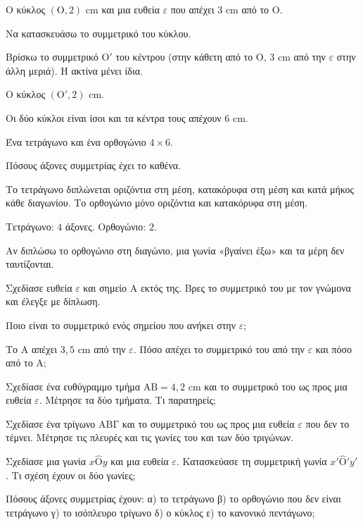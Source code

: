 \tixero Ο κύκλος $(\mathrm{Ο},2)$ cm και μια ευθεία $\varepsilon$ που απέχει $3$ cm από το $\mathrm{Ο}$.\par
\tithelo Να κατασκευάσω το συμμετρικό του κύκλου.\par
\possindeo Βρίσκω το συμμετρικό $\mathrm{Ο}'$ του κέντρου (στην κάθετη από το $\mathrm{Ο}$, $3$ cm από την $\varepsilon$ στην άλλη μεριά). Η ακτίνα μένει ίδια.\par
\apantisi Ο κύκλος $(\mathrm{Ο}',2)$ cm.\par
\elegxos Οι δύο κύκλοι είναι ίσοι και τα κέντρα τους απέχουν $6$ cm.

\tixero Ένα τετράγωνο και ένα ορθογώνιο $4\times6$.\par
\tithelo Πόσους άξονες συμμετρίας έχει το καθένα.\par
\possindeo Το τετράγωνο διπλώνεται οριζόντια στη μέση, κατακόρυφα στη μέση και κατά μήκος κάθε διαγωνίου. Το ορθογώνιο μόνο οριζόντια και κατακόρυφα στη μέση.\par
\apantisi Τετράγωνο: $4$ άξονες. Ορθογώνιο: $2$.\par
\elegxos Αν διπλώσω το ορθογώνιο στη διαγώνιο, μια γωνία «βγαίνει έξω» και τα μέρη δεν ταυτίζονται.



\ex Σχεδίασε ευθεία $\varepsilon$ και σημείο $\mathrm{Α}$ εκτός της. Βρες το συμμετρικό του με τον γνώμονα και έλεγξε με δίπλωση.

\ex Ποιο είναι το συμμετρικό ενός σημείου που ανήκει στην $\varepsilon$;

\ex Το $\mathrm{Α}$ απέχει $3{,}5$ cm από την $\varepsilon$. Πόσο απέχει το συμμετρικό του από την $\varepsilon$ και πόσο από το $\mathrm{Α}$;

\ex Σχεδίασε ένα ευθύγραμμο τμήμα $\mathrm{ΑΒ}=4{,}2$ cm και το συμμετρικό του ως προς μια ευθεία $\varepsilon$. Μέτρησε τα δύο τμήματα. Τι παρατηρείς;

\ex Σχεδίασε ένα τρίγωνο $\mathrm{ΑΒΓ}$ και το συμμετρικό του ως προς μια ευθεία $\varepsilon$ που δεν το τέμνει. Μέτρησε τις πλευρές και τις γωνίες του και των δύο τριγώνων.

\ex Σχεδίασε μια γωνία $x\hat{\mathrm{Ο}}y$ και μια ευθεία $\varepsilon$. Κατασκεύασε τη συμμετρική γωνία $x'\hat{\mathrm{Ο}}'y'$. Τι σχέση έχουν οι δύο γωνίες;

\ex Πόσους άξονες συμμετρίας έχουν: α) το τετράγωνο \quad β) το ορθογώνιο που δεν είναι τετράγωνο \quad γ) το ισόπλευρο τρίγωνο \quad δ) ο κύκλος \quad ε) το κανονικό πεντάγωνο;


